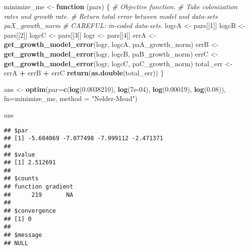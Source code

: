 \documentclass[]{article}
\newenvironment{Shaded}{\begin{snugshade}}{\end{snugshade}}
\newcommand{\KeywordTok}[1]{\textcolor[rgb]{0.13,0.29,0.53}{\textbf{#1}}}
\newcommand{\DataTypeTok}[1]{\textcolor[rgb]{0.13,0.29,0.53}{#1}}
\newcommand{\DecValTok}[1]{\textcolor[rgb]{0.00,0.00,0.81}{#1}}
\newcommand{\FloatTok}[1]{\textcolor[rgb]{0.00,0.00,0.81}{#1}}
\newcommand{\StringTok}[1]{\textcolor[rgb]{0.31,0.60,0.02}{#1}}
\newcommand{\CommentTok}[1]{\textcolor[rgb]{0.56,0.35,0.01}{\textit{#1}}}
\newcommand{\ControlFlowTok}[1]{\textcolor[rgb]{0.13,0.29,0.53}{\textbf{#1}}}
\newcommand{\OperatorTok}[1]{\textcolor[rgb]{0.81,0.36,0.00}{\textbf{#1}}}
\newcommand{\NormalTok}[1]{#1}
\begin{document}
\begin{Shaded}
\begin{Highlighting}[]
\NormalTok{minimize_me <-}\StringTok{ }\ControlFlowTok{function}\NormalTok{ (pars) \{}
  \CommentTok{# Objective function. }
  \CommentTok{# Take colonization rates and growth rate.}
  \CommentTok{# Return total error between model and data-sets paX_growth_norm}
  \CommentTok{# CAREFUL: in-coded data-sets.}
\NormalTok{  logcA <-}\StringTok{ }\NormalTok{pars[[}\DecValTok{1}\NormalTok{]] }
\NormalTok{  logcB <-}\StringTok{ }\NormalTok{pars[[}\DecValTok{2}\NormalTok{]] }
\NormalTok{  logcC <-}\StringTok{ }\NormalTok{pars[[}\DecValTok{3}\NormalTok{]] }
\NormalTok{  logr <-}\StringTok{ }\NormalTok{pars[[}\DecValTok{4}\NormalTok{]]}
\NormalTok{  errA <-}\StringTok{ }\KeywordTok{get_growth_model_error}\NormalTok{(logr, logcA, paA_growth_norm)}
\NormalTok{  errB <-}\StringTok{ }\KeywordTok{get_growth_model_error}\NormalTok{(logr, logcB, paB_growth_norm)}
\NormalTok{  errC <-}\StringTok{ }\KeywordTok{get_growth_model_error}\NormalTok{(logr, logcC, paC_growth_norm)}
\NormalTok{  total_err <-}\StringTok{ }\NormalTok{errA }\OperatorTok{+}\StringTok{ }\NormalTok{errB }\OperatorTok{+}\StringTok{ }\NormalTok{errC}
  \KeywordTok{return}\NormalTok{(}\KeywordTok{as.double}\NormalTok{(total_err))}
\NormalTok{\}}

\NormalTok{ans <-}\StringTok{ }\KeywordTok{optim}\NormalTok{(}\DataTypeTok{par=}\KeywordTok{c}\NormalTok{(}\KeywordTok{log}\NormalTok{(}\FloatTok{0.0038210}\NormalTok{), }\KeywordTok{log}\NormalTok{(}\FloatTok{7e-04}\NormalTok{), }\KeywordTok{log}\NormalTok{(}\FloatTok{0.00019}\NormalTok{), }\KeywordTok{log}\NormalTok{(}\FloatTok{0.08}\NormalTok{)), }
             \DataTypeTok{fn=}\NormalTok{minimize_me,}
             \DataTypeTok{method =} \StringTok{"Nelder-Mead"}\NormalTok{)}

\NormalTok{ans}
\end{Highlighting}
\end{Shaded}

\begin{verbatim}
## $par
## [1] -5.604069 -7.077498 -7.999112 -2.471371
## 
## $value
## [1] 2.512691
## 
## $counts
## function gradient 
##      219       NA 
## 
## $convergence
## [1] 0
## 
## $message
## NULL
\end{verbatim}

\begin{Shaded}
\end{Shaded}
\end{document}
